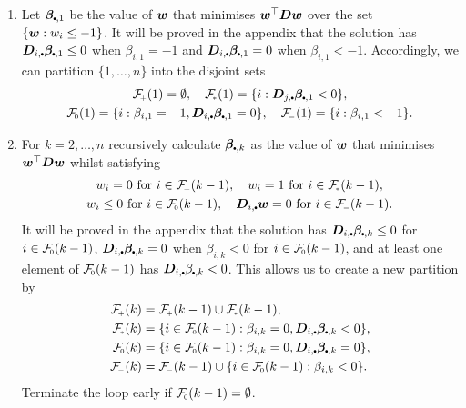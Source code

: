 \begin{pseudoalgorithm}\label{A:Main}\mbox{}
\begin{enumerate}
\item Let $\bfbeta_{\sbullet,1}$ be the value of $\bm{w}$ that minimises
$\bm{w}^\top \bm{D} \bm{w}$ over the set $\{ \bm{w} : w_i \leq -1\}$.
It will be proved in the appendix that the solution has
$\bfD_{i,\sbullet}  \bfbeta_{\sbullet,1} \leq 0$ when $\beta_{i,1} = -1$ and
$\bfD_{i,\sbullet}  \bfbeta_{\sbullet,1} = 0$ when $\beta_{i,1} <-1$.
Accordingly, we can  partition $\{1,\ldots,n\}$ into the disjoint sets
\begin{gather*}
	\Fset{+}(1) = \emptyset, \quad
	\Fset{*}(1) = \{ i : \bfD_{j,\sbullet}  \bfbeta_{\sbullet,1} < 0\},\\
	\Fset{0}(1) = \{ i : \beta_{i,1} = -1, \bfD_{i,\sbullet}
           \bfbeta_{\sbullet,1} = 0\},\quad
	\Fset{-}(1) = \{ i : \beta_{i,1} < -1\}.
\end{gather*}

\item For $k = 2, \dots, n$ recursively calculate $\bfbeta_{\sbullet,k}$ as the value
of $\bm{w}$ that minimises $\bm{w}^\top \bm{D} \bm{w}$ whilst satisfying
\begin{gather*}
 w_i = 0\ \text{for}\ i\in \Fset{+}(k-1), \quad
 w_i = 1\ \text{for}\ i\in \Fset{*}(k-1),\\
 w_i \leq 0\ \text{for}\ i\in \Fset{0}(k-1), \quad
 \bfD_{i,\sbullet}  \bfw = 0\ \text{for}\ i\in \Fset{-}(k-1).
\end{gather*}
It will be proved in the appendix that the solution has
$\bfD_{i,\sbullet}  \bfbeta_{\sbullet,k} \leq 0$ for $i \in \Fset{0}(k-1)$,
$\bfD_{i,\sbullet}  \bfbeta_{\sbullet,k} = 0$ when $\beta_{i,k} < 0$ for $i\in \Fset{0}(k-1)$,
and at least one element of $\Fset{0}(k-1)$ has
$\bfD_{i,\sbullet} \beta_{\sbullet,k} < 0$. This allows us to
create a new partition by
\begin{align*}
	\Fset{+}(k) &= \Fset{+}(k-1) \cup \Fset{*}(k-1), \\
	\Fset{*}(k) &= \{ i \in \Fset{0}(k-1) :
           \beta_{i,k}=0, \bfD_{i,\sbullet}  \bfbeta_{\sbullet,k} < 0 \}, \\
	\Fset{0}(k) &= \{ i \in \Fset{0}(k-1) :
           \beta_{i,k}=0, \bfD_{i,\sbullet}  \bfbeta_{\sbullet,k} = 0 \}, \\
	\Fset{-}(k) &= \Fset{-}(k-1) \cup \{ i \in \Fset{0}(k-1) : \beta_{i,k} < 0 \}.
\end{align*}
Terminate the loop early if $\Fset{0}(k-1) = \emptyset$.


\end{enumerate}
\end{pseudoalgorithm}
